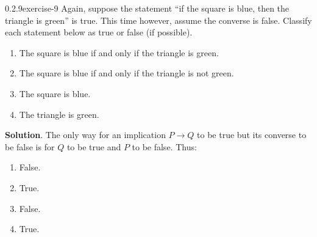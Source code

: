 \documentclass[twoside,11pt,]{book}
\numberwithin{equation}{chapter}
\newcommand{\imp}{\rightarrow}
\begin{document}
\begin{divisionsolution}{0.2.9}{}{exercise-9}%
\hypertarget{p-250}{}%
Again, suppose the statement ``if the square is blue, then the triangle is green'' is true. This time however, assume the converse is false. Classify each statement below as true or false (if possible).\leavevmode%
\begin{enumerate}[label=(\alph*)]
\item\hypertarget{li-227}{}\hypertarget{p-251}{}%
The square is blue if and only if the triangle is green. %
\item\hypertarget{li-232}{}\hypertarget{p-252}{}%
The square is blue if and only if the triangle is not green. %
\item\hypertarget{li-237}{}\hypertarget{p-253}{}%
The square is blue. %
\item\hypertarget{li-242}{}\hypertarget{p-254}{}%
The triangle is green. %
\end{enumerate}
%
\par\smallskip%
\noindent\textbf{Solution}.\quad%
\hypertarget{p-255}{}%
The only way for an implication \(P\imp Q\) to be true but its converse to be false is for \(Q\) to be true and \(P\) to be false. Thus:\leavevmode%
\begin{enumerate}[label=(\alph*)]
\item\hypertarget{li-247}{}\hypertarget{p-256}{}%
False.%
\item\hypertarget{li-248}{}\hypertarget{p-257}{}%
True.%
\item\hypertarget{li-249}{}\hypertarget{p-258}{}%
False.%
\item\hypertarget{li-250}{}\hypertarget{p-259}{}%
True.%
\end{enumerate}
%
\end{divisionsolution}%
\end{document}

